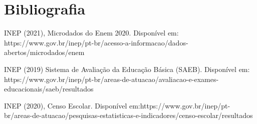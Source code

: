 \documentclass[12pt,a4paper]{article}
\begin{document}
\section{Bibliografia}
\renewcommand{\section}[2]{}%
\begin{thebibliography}{3}
INEP (2021), Microdados do Enem 2020. Disponível em: https://www.gov.br/inep/pt-br/acesso-a-informacao/dados-abertos/microdados/enem

INEP (2019) Sistema de Avaliação da Educação Básica (SAEB). Disponível em: https://www.gov.br/inep/pt-br/areas-de-atuacao/avaliacao-e-exames-educacionais/saeb/resultados

INEP (2020), Censo Escolar. Disponível em:https://www.gov.br/inep/pt-br/areas-de-atuacao/pesquisas-estatisticas-e-indicadores/censo-escolar/resultados
\end{thebibliography}
\end{document}
